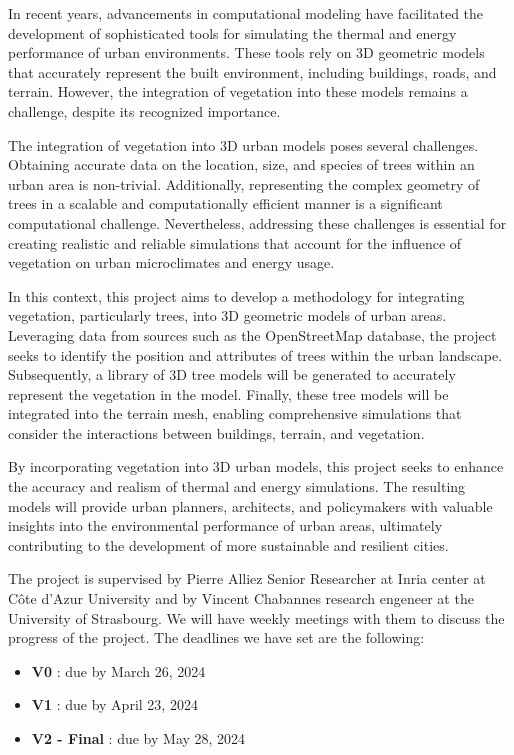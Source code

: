 \documentclass[12pt]{article}
\begin{document}
In recent years, advancements in computational modeling have facilitated the 
development of sophisticated tools for simulating the thermal and energy performance 
of urban environments. These tools rely on 3D geometric models that accurately 
represent the built environment, including buildings, roads, and terrain. However, 
the integration of vegetation into these models remains a challenge, despite its 
recognized importance.

The integration of vegetation into 3D urban models poses several challenges. 
Obtaining accurate data on the location, size, and species of trees within an 
urban area is non-trivial. Additionally, representing the complex geometry of trees 
in a scalable and computationally efficient manner is a significant computational 
challenge. Nevertheless, addressing these challenges is essential for creating 
realistic and reliable simulations that account for the influence of vegetation on 
urban microclimates and energy usage.

In this context, this project aims to develop a methodology for integrating 
vegetation, particularly trees, into 3D geometric models of urban areas. Leveraging 
data from sources such as the OpenStreetMap database, the project seeks to identify 
the position and attributes of trees within the urban landscape. Subsequently, a 
library of 3D tree models will be generated to accurately represent the vegetation 
in the model. Finally, these tree models will be integrated into the terrain mesh, 
enabling comprehensive simulations that consider the interactions between buildings, 
terrain, and vegetation.

By incorporating vegetation into 3D urban models, this project seeks to enhance the 
accuracy and realism of thermal and energy simulations. The resulting models will 
provide urban planners, architects, and policymakers with valuable insights into 
the environmental performance of urban areas, ultimately contributing to the 
development of more sustainable and resilient cities.

The project is supervised by Pierre Alliez
Senior Researcher at Inria center at Côte d'Azur University
and by Vincent Chabannes research engeneer at the University of Strasbourg.
We will have weekly meetings with them to discuss the progress of the project.
The deadlines we have set are the following:
\begin{itemize}
    \item \textbf{V0} : due by March 26, 2024
    \item \textbf{V1} : due by April 23, 2024
    \item \textbf{V2 - Final} : due by May 28, 2024
\end{itemize}
\end{document}
